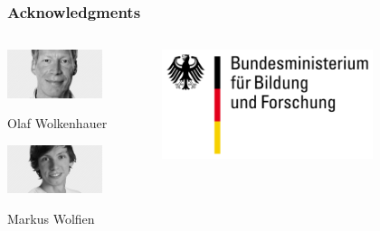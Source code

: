\documentclass[xcolor=dvipsnames]{beamer}
\begin{document}
%
%
\begin{frame}
  \frametitle{Acknowledgments}
  \begin{columns}
    \begin{column}{0.5\textwidth}
      \begin{center}
        \includegraphics[width=0.70\textwidth]{images/sbi_olaf}
      \end{center}
      \vspace{-0.8cm}
      \begin{center}
        Olaf Wolkenhauer
      \end{center}
      \vspace{-0.1cm}
      \begin{center}
        \includegraphics[width=0.70\textwidth]{images/sbi_markus}
      \end{center}
      \vspace{-0.8cm}
      \begin{center}
        Markus Wolfien
      \end{center}
    \end{column}
    \begin{column}{0.5\textwidth}
      \vspace{0.5cm}
      \begin{center}
        \includegraphics[width=0.70\textwidth]{images/logo_bmbf}

\end{center}
\end{column}
\end{columns}
\end{frame}
\end{document}
